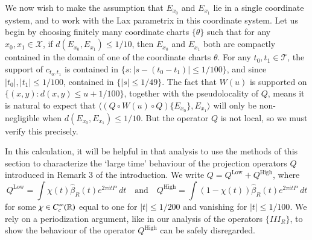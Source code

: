 We now wish to make the assumption that $E_{x_0}$ and $E_{x_1}$ lie in a single coordinate system, and to work with the Lax parametrix in this coordinate system. Let us begin by choosing finitely many coordinate charts $\{ \theta \}$ such that for any $x_0,x_1 \in \mathcal{X}$, if $d(E_{x_0}, E_{x_1}) \leq 1/10$, then $E_{x_0}$ and $E_{x_1}$ both are compactly contained in the domain of one of the coordinate charts $\theta$. For any $t_0, t_1 \in \mathcal{T}$, the support of $c_{t_0,t_1}$ is contained in $\{ s : |s - (t_0 - t_1)| \leq 1/100 \}$, and since $|t_0|, |t_1| \leq 1/100$, contained in $\{ |s| \leq 1/49 \}$. The fact that $W(u)$ is supported on $\{ (x,y): d(x,y) \leq u + 1/100 \}$, together with the pseudolocality of $Q$, means it is natural to expect that $\langle (Q \circ W(u) \circ Q) \{ E_{x_0} \}, E_{x_1} \rangle$ will only be non-negligible when $d(E_{x_0}, E_{x_1}) \leq 1/10$. But the operator $Q$ is not local, so we must verify this precisely.

In this calculation, it will be helpful in that analysis to use the methods of this section to characterize the `large time' behaviour of the projection operators $Q$ introduced in Remark 3 of the introduction. We write $Q = Q^{\text{Low}} + Q^{\text{High}}$, where
%
\[ Q^{\text{Low}} = \int \chi(t) \widehat{\beta}_R(t) e^{2 \pi i t P}\; dt \quad\text{and}\quad Q^{\text{High}} = \int (1 - \chi(t)) \widehat{\beta}_R(t) e^{2 \pi i t P}\; dt \]
%
for some $\chi \in C_c^\infty(\operatorname{\mathbb{R}})$ equal to one for $|t| \leq 1/200$ and vanishing for $|t| \leq 1/100$. We rely on a periodization argument, like in our analysis of the operators $\{ III_R \}$, to show the behaviour of the operator $Q^{\text{High}}$ can be safely disregarded.

